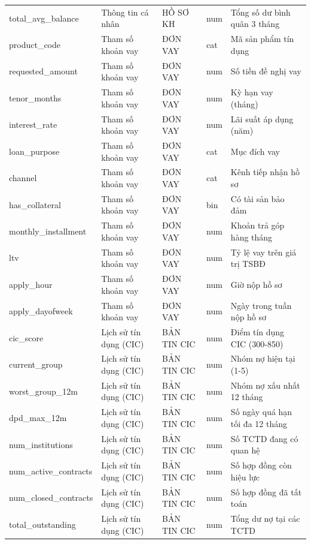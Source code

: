 \begin{longtable}{@{}L{3.761cm}L{2.121cm}L{2.314cm}L{1.061cm}L{4.918cm}@{}}
total\_\allowbreak avg\_\allowbreak balance & Thông tin cá nhân & HỒ SƠ KH & num & Tổng số dư bình quân 3 tháng \\
product\_\allowbreak code & Tham số khoản vay & ĐƠN VAY & cat & Mã sản phẩm tín dụng \\
requested\_\allowbreak amount & Tham số khoản vay & ĐƠN VAY & num & Số tiền đề nghị vay \\
tenor\_\allowbreak months & Tham số khoản vay & ĐƠN VAY & num & Kỳ hạn vay (tháng) \\
interest\_\allowbreak rate & Tham số khoản vay & ĐƠN VAY & num & Lãi suất áp dụng (năm) \\
loan\_\allowbreak purpose & Tham số khoản vay & ĐƠN VAY & cat & Mục đích vay \\
channel & Tham số khoản vay & ĐƠN VAY & cat & Kênh tiếp nhận hồ sơ \\
has\_\allowbreak collateral & Tham số khoản vay & ĐƠN VAY & bin & Có tài sản bảo đảm \\
monthly\_\allowbreak installment & Tham số khoản vay & ĐƠN VAY & num & Khoản trả góp hàng tháng \\
ltv & Tham số khoản vay & ĐƠN VAY & num & Tỷ lệ vay trên giá trị TSBĐ \\
apply\_hour & Tham số khoản vay & ĐƠN VAY & num & Giờ nộp hồ sơ \\
apply\_\allowbreak dayofweek & Tham số khoản vay & ĐƠN VAY & num & Ngày trong tuần nộp hồ sơ \\
cic\_score & Lịch sử tín dụng (CIC) & BẢN TIN CIC & num & Điểm tín dụng CIC (300-850) \\
current\_\allowbreak group & Lịch sử tín dụng (CIC) & BẢN TIN CIC & num & Nhóm nợ hiện tại (1-5) \\
worst\_\allowbreak group\_\allowbreak 12m & Lịch sử tín dụng (CIC) & BẢN TIN CIC & num & Nhóm nợ xấu nhất 12 tháng \\
dpd\_\allowbreak max\_\allowbreak 12m & Lịch sử tín dụng (CIC) & BẢN TIN CIC & num & Số ngày quá hạn tối đa 12 tháng \\
num\_\allowbreak institutions & Lịch sử tín dụng (CIC) & BẢN TIN CIC & num & Số TCTD đang có quan hệ \\
num\_\allowbreak active\_\allowbreak contracts & Lịch sử tín dụng (CIC) & BẢN TIN CIC & num & Số hợp đồng còn hiệu lực \\
num\_\allowbreak closed\_\allowbreak contracts & Lịch sử tín dụng (CIC) & BẢN TIN CIC & num & Số hợp đồng đã tất toán \\
total\_\allowbreak outstanding & Lịch sử tín dụng (CIC) & BẢN TIN CIC & num & Tổng dư nợ tại các TCTD \\

\end{longtable}
